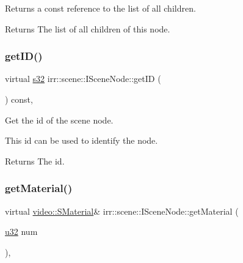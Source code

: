 Returns a const reference to the list of all children. 

\begin{DoxyReturn}{Returns}
The list of all children of this node. 
\end{DoxyReturn}
\mbox{\label{classirr_1_1scene_1_1ISceneNode_a1a3b5b32f54bc1b6617756fc48a2cb17}} 
\subsubsection{\texorpdfstring{get\+I\+D()}{getID()}}
{\footnotesize\ttfamily virtual \hyperlink{namespaceirr_ac66849b7a6ed16e30ebede579f9b47c6}{s32} irr\+::scene\+::\+I\+Scene\+Node\+::get\+ID (\begin{DoxyParamCaption}{ }\end{DoxyParamCaption}) const\hspace{0.3cm}{\ttfamily [inline]}, {\ttfamily [virtual]}}



Get the id of the scene node. 

This id can be used to identify the node. \begin{DoxyReturn}{Returns}
The id. 
\end{DoxyReturn}
\mbox{\label{classirr_1_1scene_1_1ISceneNode_a1f44d8cf753b2e4c17c90d4fc2ed05b2}} 
\subsubsection{\texorpdfstring{get\+Material()}{getMaterial()}}
{\footnotesize\ttfamily virtual \hyperlink{classirr_1_1video_1_1SMaterial}{video\+::\+S\+Material}\& irr\+::scene\+::\+I\+Scene\+Node\+::get\+Material (\begin{DoxyParamCaption}\item[{\hyperlink{namespaceirr_a0416a53257075833e7002efd0a18e804}{u32}}]{num }\end{DoxyParamCaption})\hspace{0.3cm}{\ttfamily [inline]}, {\ttfamily [virtual]}}



